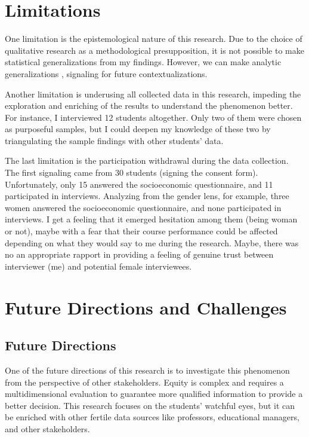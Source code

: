  \section{Limitations}
 \label{conclusions-sec:limitations}

One limitation is the epistemological nature of this research. Due to the choice of qualitative research as a methodological presupposition, it is not possible to make statistical generalizations from my findings. However, we can make analytic generalizations \cite{kennedy:1979}, signaling for future contextualizations.

Another limitation is underusing all collected data in this research, impeding the exploration and enriching of the results to understand the phenomenon better. For instance, I interviewed 12 students altogether. Only two of them were chosen as purposeful samples, but I could deepen my knowledge of these two by triangulating the sample findings with other students' data.

The last limitation is the participation withdrawal during the data collection. The first signaling came from 30 students (signing the consent form). Unfortunately, only 15 answered the socioeconomic questionnaire, and 11 participated in interviews. Analyzing from the gender lens, for example, three women answered the socioeconomic questionnaire, and none participated in interviews. I get a feeling that it emerged hesitation among them (being woman or not), maybe with a fear that their course performance could be affected depending on what they would say to me during the research. Maybe, there was no an appropriate rapport \cite{thwaites:2017} in providing a feeling of genuine trust between interviewer (me)
and potential female interviewees.


 \section{Future Directions and Challenges}
 \label{conclusions-sec:challenges}
 
\subsection{Future Directions}

One of the future directions of this research is to investigate this phenomenon from the perspective of other stakeholders. Equity is complex and requires a multidimensional evaluation to guarantee more qualified information to provide a better decision. This research focuses on the students' watchful eyes, but it can be enriched with other fertile data sources like professors, educational managers, and other stakeholders.

